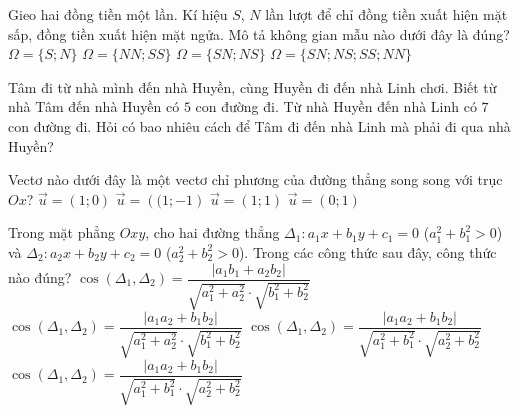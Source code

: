 \begin{ex}%
	Gieo hai đồng tiền một lần. Kí hiệu $S$, $N$ lần lượt để chỉ đồng tiền xuất hiện mặt sấp, đồng tiền xuất hiện mặt ngửa. Mô tả không gian mẫu nào dưới đây là đúng?
	\choice
	{$\Omega=\{S; N\}$}
	{$\Omega=\{NN; SS\}$}
	{$\Omega=\{SN; NS\}$}
	{\True $\Omega=\{SN; NS; SS; NN\}$}
\end{ex}

\begin{ex}%
	Tâm đi từ nhà mình đến nhà Huyền, cùng Huyền đi đến nhà Linh chơi. Biết từ nhà Tâm đến nhà Huyền có $5$ con đường đi. Từ nhà Huyền đến nhà Linh có $7$ con đường đi. Hỏi có bao nhiêu cách để Tâm đi đến nhà Linh mà phải đi qua nhà Huyền?
\end{ex}

\begin{ex}%
	Vectơ nào dưới đây là một vectơ chỉ phương của đường thẳng song song với trục $Ox$?
	\choice
	{\True $\vec u=\left( 1;0 \right)$}
	{$\vec u=\left((1;-1\right)$}
	{$\vec u=\left(1;1\right)$}
	{$\vec u=\left(0;1\right)$}
\end{ex}

\begin{ex}%
	Trong mặt phẳng $Oxy$, cho hai đường thẳng $\Delta_1\colon a_1x+b_1y+c_1=0$ ($a_1^2+b_1^2>0$) và $\Delta_2\colon a_2x+b_2y+c_2=0$ ($a_2^2+b_2^2>0$). Trong các công thức sau đây, công thức nào đúng?
	\choice
	{$\cos\left(\Delta_1,\Delta_2\right)=\dfrac{\left|a_1b_1+a_2b_2\right|}{\sqrt{a_1^2+a_2^2}\cdot\sqrt{b_1^2+b_2^2}}$}
	{$\cos\left(\Delta_1,\Delta_2\right)=\dfrac{\left|a_1a_2+b_1b_2\right|}{\sqrt{a_1^2+a_2^2}\cdot\sqrt{b_1^2+b_2^2}}$}
	{\True $\cos\left(\Delta_1,\Delta_2\right)=\dfrac{\left|a_1a_2+b_1b_2\right|}{\sqrt{a_1^2+b_1^2}\cdot\sqrt{a_2^2+b_2^2}}$}
	{$\cos\left(\Delta_1,\Delta_2\right)=\dfrac{\left|a_1a_2+b_1b_2\right|}{\sqrt{a_1^2+b_1^2}\cdot\sqrt{a_2^2+b_2^2}}$}
\end{ex}

